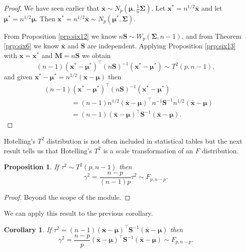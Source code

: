 \documentclass[]{book}
\newtheorem{corollary}{Corollary}[chapter]
\newtheorem{proposition}{Proposition}[chapter]
\theoremstyle{definition}
\theoremstyle{definition}
\theoremstyle{definition}
\theoremstyle{remark}
\begin{document}
\begin{proof}
{}We have seen earlier that \(\bar{\mathbf x} \sim N_p({\boldsymbol{\mu}},\frac{1}{n}\boldsymbol{\Sigma})\). Let \(\mathbf x^\ast = n^{1/2} \bar{\mathbf x}\) and let \({\boldsymbol{\mu}}^\ast = n^{1/2} {\boldsymbol{\mu}}\). Then \(\mathbf x^\ast=n^{1/2} \bar{\mathbf x} \sim N_p({\boldsymbol{\mu}}^\ast, \boldsymbol{\Sigma})\).

From Proposition \ref{prp:six12} we know \(n\mathbf S\sim W_p(\boldsymbol{\Sigma},n-1)\), and from Theorem \ref{prp:six6} we know \(\bar{\mathbf x}\) and \(\mathbf S\) are independent. Applying Proposition \ref{prp:six13} with \(\mathbf x= \mathbf x^\ast\) and \(\mathbf M= n\mathbf S\) we obtain
\[ (n-1)(\mathbf x^\ast - {\boldsymbol{\mu}}^\ast)^\top (n\mathbf S)^{-1} (\mathbf x^\ast - {\boldsymbol{\mu}}^\ast) \sim T^2(p,n-1),\]
and given \(\mathbf x^\ast - {\boldsymbol{\mu}}^\ast = n^{1/2} (\mathbf x-{\boldsymbol{\mu}})\) then
\begin{align*}
&(n-1)(\mathbf x^\ast - {\boldsymbol{\mu}}^\ast)^\top (n\mathbf S)^{-1} (\mathbf x^\ast - {\boldsymbol{\mu}}^\ast)\\
& \qquad \qquad = (n-1)n^{1/2}(\bar{\mathbf x}-{\boldsymbol{\mu}})^\top n^{-1} \mathbf S^{-1} n^{1/2}(\bar{\mathbf x}-{\boldsymbol{\mu}}) \\
&\qquad \qquad = (n-1)(\bar{\mathbf x}-{\boldsymbol{\mu}})^\top \mathbf S^{-1} (\bar{\mathbf x}-{\boldsymbol{\mu}}).
\end{align*}
\end{proof}

Hotelling's \(T^2\) distribution is not often included in statistical tables but the next result tells us that Hotelling's \(T^2\) is a scale transformation of an \(F\) distribution.

\begin{proposition}
\protect\hypertarget{prp:six14}{}{\label{prp:six14} }If \(\tau^2 \sim T^2(p,n-1)\) then
\[\gamma^2 = \frac{n-p}{(n-1)p} \tau^2 \sim F_{p,n-p}.\]
\end{proposition}

\begin{proof}
{} Beyond the scope of the module.
\end{proof}

We can apply this result to the previous corollary.

\begin{corollary}
\protect\hypertarget{cor:csix6}{}{\label{cor:csix6} } If \(\tau^2 = (n-1)(\bar{\mathbf x}-{\boldsymbol{\mu}})^\top \mathbf S^{-1} (\bar{\mathbf x}-{\boldsymbol{\mu}})\) then
\[ \gamma^2 = \frac{n-p}{p} (\bar{\mathbf x}-{\boldsymbol{\mu}})^\top \mathbf S^{-1} (\bar{\mathbf x}-{\boldsymbol{\mu}}) \sim F_{p,n-p}. \]
\end{corollary}
\end{document}
